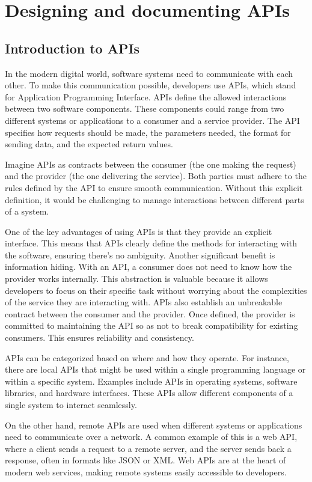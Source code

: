 \chapter{Designing and documenting APIs}
\section{Introduction to APIs}
In the modern digital world, software systems need to communicate with each other. To make this communication possible, developers use APIs, which stand for Application Programming Interface. APIs define the allowed interactions between two software components. These components could range from two different systems or applications to a consumer and a service provider. The API specifies how requests should be made, the parameters needed, the format for sending data, and the expected return values.

Imagine APIs as contracts between the consumer (the one making the request) and the provider (the one delivering the service). Both parties must adhere to the rules defined by the API to ensure smooth communication. Without this explicit definition, it would be challenging to manage interactions between different parts of a system.

One of the key advantages of using APIs is that they provide an explicit interface. This means that APIs clearly define the methods for interacting with the software, ensuring there’s no ambiguity.
Another significant benefit is information hiding. With an API, a consumer does not need to know how the provider works internally. This abstraction is valuable because it allows developers to focus on their specific task without worrying about the complexities of the service they are interacting with.
APIs also establish an unbreakable contract between the consumer and the provider. Once defined, the provider is committed to maintaining the API so as not to break compatibility for existing consumers. This ensures reliability and consistency.

APIs can be categorized based on where and how they operate. For instance, there are local APIs that might be used within a single programming language or within a specific system. Examples include APIs in operating systems, software libraries, and hardware interfaces. These APIs allow different components of a single system to interact seamlessly.

On the other hand, remote APIs are used when different systems or applications need to communicate over a network. A common example of this is a web API, where a client sends a request to a remote server, and the server sends back a response, often in formats like JSON or XML. Web APIs are at the heart of modern web services, making remote systems easily accessible to developers.

